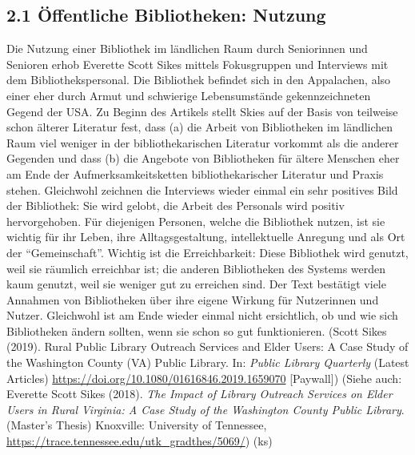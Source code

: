 \documentclass[a4paper,
fontsize=11pt,
oneside,
numbers=noperiodatend,
parskip=half-,
bibliography=totoc,
final
]{scrartcl}
\begin{document}
\hypertarget{uxf6ffentliche-bibliotheken-nutzung}{%
\subsection{2.1 Öffentliche Bibliotheken:
Nutzung}\label{uxf6ffentliche-bibliotheken-nutzung}}

Die Nutzung einer Bibliothek im ländlichen Raum durch Seniorinnen und
Senioren erhob Everette Scott Sikes mittels Fokusgruppen und Interviews
mit dem Bibliothekspersonal. Die Bibliothek befindet sich in den
Appalachen, also einer eher durch Armut und schwierige Lebensumstände
gekennzeichneten Gegend der USA. Zu Beginn des Artikels stellt Skies auf
der Basis von teilweise schon älterer Literatur fest, dass (a) die
Arbeit von Bibliotheken im ländlichen Raum viel weniger in der
bibliothekarischen Literatur vorkommt als die anderer Gegenden und dass
(b) die Angebote von Bibliotheken für ältere Menschen eher am Ende der
Aufmerksamkeitsketten bibliothekarischer Literatur und Praxis stehen.
Gleichwohl zeichnen die Interviews wieder einmal ein sehr positives Bild
der Bibliothek: Sie wird gelobt, die Arbeit des Personals wird positiv
hervorgehoben. Für diejenigen Personen, welche die Bibliothek nutzen,
ist sie wichtig für ihr Leben, ihre Alltagsgestaltung, intellektuelle
Anregung und als Ort der \enquote{Gemeinschaft}. Wichtig ist die
Erreichbarkeit: Diese Bibliothek wird genutzt, weil sie räumlich
erreichbar ist; die anderen Bibliotheken des Systems werden kaum
genutzt, weil sie weniger gut zu erreichen sind. Der Text bestätigt
viele Annahmen von Bibliotheken über ihre eigene Wirkung für Nutzerinnen
und Nutzer. Gleichwohl ist am Ende wieder einmal nicht ersichtlich, ob
und wie sich Bibliotheken ändern sollten, wenn sie schon so gut
funktionieren. (Scott Sikes (2019). Rural Public Library Outreach
Services and Elder Users: A Case Study of the Washington County (VA)
Public Library. In: \emph{Public Library Quarterly} (Latest Articles)
\url{https://doi.org/10.1080/01616846.2019.1659070} {[}Paywall{]})
(Siehe auch: Everette Scott Sikes (2018). \emph{The Impact of Library
Outreach Services on Elder Users in Rural Virginia: A Case Study of the
Washington County Public Library}. (Master's Thesis) Knoxville:
University of Tennessee,
\url{https://trace.tennessee.edu/utk_gradthes/5069/}) (ks)
\end{document}
